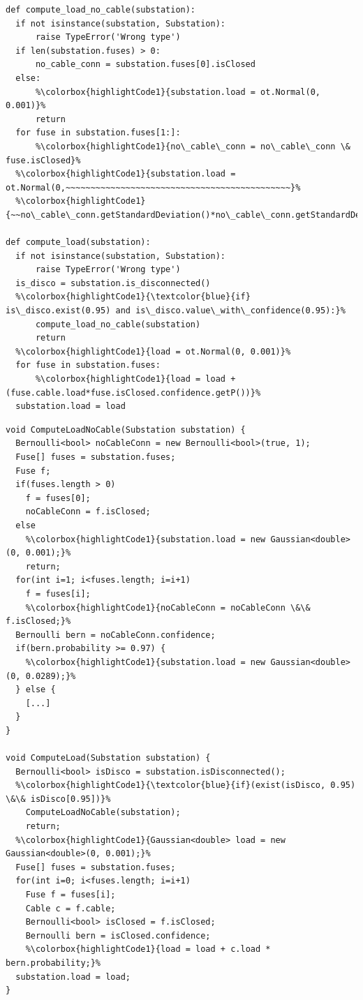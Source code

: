 \begin{lstlisting}[style=pythonStyle, caption={Excerpt of the OpenTurns implementation (Python)}, label=lst:valid-expr-python, linewidth=0.97\textwidth, escapechar=\%]
def compute_load_no_cable(substation):
  if not isinstance(substation, Substation):
      raise TypeError('Wrong type')
  if len(substation.fuses) > 0:
      no_cable_conn = substation.fuses[0].isClosed
  else:
      %\colorbox{highlightCode1}{substation.load = ot.Normal(0, 0.001)}%
      return
  for fuse in substation.fuses[1:]:
      %\colorbox{highlightCode1}{no\_cable\_conn = no\_cable\_conn \& fuse.isClosed}%
  %\colorbox{highlightCode1}{substation.load = ot.Normal(0,~~~~~~~~~~~~~~~~~~~~~~~~~~~~~~~~~~~~~~~~~~~~~}%
  %\colorbox{highlightCode1}{~~no\_cable\_conn.getStandardDeviation()*no\_cable\_conn.getStandardDeviation())}%

def compute_load(substation):
  if not isinstance(substation, Substation):
      raise TypeError('Wrong type')
  is_disco = substation.is_disconnected()
  %\colorbox{highlightCode1}{\textcolor{blue}{if} is\_disco.exist(0.95) and is\_disco.value\_with\_confidence(0.95):}%
      compute_load_no_cable(substation)
      return
  %\colorbox{highlightCode1}{load = ot.Normal(0, 0.001)}%
  for fuse in substation.fuses:
      %\colorbox{highlightCode1}{load = load + (fuse.cable.load*fuse.isClosed.confidence.getP())}%
  substation.load = load	
\end{lstlisting}

\begin{lstlisting}[style=uMiniJavaStyle, caption={Excerpt of the \langName{} implementation}, label=lst:valid-expruscript, linewidth=0.97\textwidth, escapechar=\%]
void ComputeLoadNoCable(Substation substation) {
  Bernoulli<bool> noCableConn = new Bernoulli<bool>(true, 1);
  Fuse[] fuses = substation.fuses;
  Fuse f;
  if(fuses.length > 0) 
    f = fuses[0];
    noCableConn = f.isClosed;
  else
    %\colorbox{highlightCode1}{substation.load = new Gaussian<double>(0, 0.001);}%
    return;
  for(int i=1; i<fuses.length; i=i+1)
    f = fuses[i];
    %\colorbox{highlightCode1}{noCableConn = noCableConn \&\& f.isClosed;}%
  Bernoulli bern = noCableConn.confidence;
  if(bern.probability >= 0.97) {
    %\colorbox{highlightCode1}{substation.load = new Gaussian<double>(0, 0.0289);}%
  } else {
    [...]
  }
}

void ComputeLoad(Substation substation) {
  Bernoulli<bool> isDisco = substation.isDisconnected();
  %\colorbox{highlightCode1}{\textcolor{blue}{if}(exist(isDisco, 0.95) \&\& isDisco[0.95])}%
    ComputeLoadNoCable(substation);
    return;
  %\colorbox{highlightCode1}{Gaussian<double> load = new Gaussian<double>(0, 0.001);}%
  Fuse[] fuses = substation.fuses;
  for(int i=0; i<fuses.length; i=i+1)
    Fuse f = fuses[i];
    Cable c = f.cable;
    Bernoulli<bool> isClosed = f.isClosed;
    Bernoulli bern = isClosed.confidence;
    %\colorbox{highlightCode1}{load = load + c.load * bern.probability;}%
  substation.load = load;
}
\end{lstlisting}


